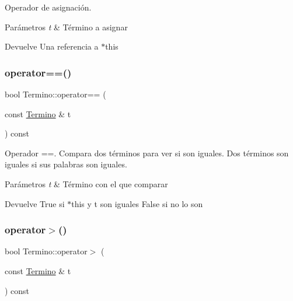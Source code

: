 Operador de asignación. 


\begin{DoxyParams}{Parámetros}
{\em t} & Término a asignar \\
\hline
\end{DoxyParams}
\begin{DoxyReturn}{Devuelve}
Una referencia a $\ast$this 
\end{DoxyReturn}
\mbox{\label{classTermino_adf075fbce1b208a5214e9364e5f2520a}} 
\subsubsection{\texorpdfstring{operator==()}{operator==()}}
{\footnotesize\ttfamily bool Termino\+::operator== (\begin{DoxyParamCaption}\item[{const \mbox{\hyperlink{classTermino}{Termino}} \&}]{t }\end{DoxyParamCaption}) const}



Operador ==. Compara dos términos para ver si son iguales. Dos términos son iguales si sus palabras son iguales. 


\begin{DoxyParams}{Parámetros}
{\em t} & Término con el que comparar \\
\hline
\end{DoxyParams}
\begin{DoxyReturn}{Devuelve}
True si $\ast$this y t son iguales False si no lo son 
\end{DoxyReturn}
\mbox{\label{classTermino_a72be5a52ffa4dbf55ecd6dfb6af12476}} 
\subsubsection{\texorpdfstring{operator$>$()}{operator>()}}
{\footnotesize\ttfamily bool Termino\+::operator$>$ (\begin{DoxyParamCaption}\item[{const \mbox{\hyperlink{classTermino}{Termino}} \&}]{t }\end{DoxyParamCaption}) const}



